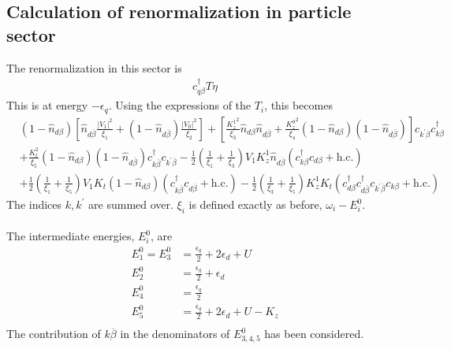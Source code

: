 \documentclass[twoside]{report}
\numberwithin{equation}{section}
\begin{document}
\subsection{Calculation of renormalization in particle sector}
The renormalization in this sector is
\begin{equation}\begin{aligned}
	c^\dagger_{q\beta} T \eta
\end{aligned}\end{equation}
This is at energy \(-\epsilon_q\).
Using the expressions of the \(T_i\), this becomes
\begin{equation}\begin{aligned}
	&\left(1 - \hat n_{d\beta}\right)\left[\hat n_{d\overline\beta}\frac{|V_1|^2}{\xi_1} + \left(1 - \hat n_{d\overline\beta}\right)\frac{|V_0|^2}{\xi_2}\right] + \left[\frac{{K_z^1}^2}{\xi_3}\hat n_{d\beta}\hat n_{d\overline\beta} + \frac{{K_z^0}^2}{\xi_4}\left(1 - \hat n_{d\beta}\right)\left(1 - \hat n_{d\overline\beta}\right)\right]c_{k^\prime\beta}c^\dagger_{k\beta} \\
	&+ \frac{K_t^2}{\xi_5}\left(1 - \hat n_{d\beta}\right)\left(1 - \hat n_{d\overline\beta}\right)c^\dagger_{k\overline\beta}c_{k^\prime\overline\beta} - \frac{1}{2}\left(\frac{1}{\xi_1} + \frac{1}{\xi_3} \right)V_1 K_z^1 \hat n_{d\overline\beta}\left(c^\dagger_{k\beta}c_{d\beta} + \text{h.c.}\right) \\
	&+ \frac{1}{2}\left(\frac{1}{\xi_1} + \frac{1}{\xi_5} \right)V_1 K_t \left(1 - \hat n_{d\beta}\right)\left(c^\dagger_{k\overline\beta}c_{d\overline\beta} + \text{h.c.}\right)- \frac{1}{2}\left(\frac{1}{\xi_3} + \frac{1}{\xi_5} \right)K_z^1 K_t \left(c^\dagger_{d\beta}c^\dagger_{d\overline\beta}c_{k^\prime\overline\beta}c_{k\beta} + \text{h.c.}\right)
\end{aligned}\end{equation}
The indices \(k,k^\prime\) are summed over.
\(\xi_i\) is defined exactly as before, \(\omega_i - E_i^0\).
\\\\The intermediate energies, \(E_i^0\), are
\begin{equation}\begin{aligned}
	E^0_1 = E_3^0 &= \frac{\epsilon_q}{2} + 2\epsilon_d + U\\
	E^0_2 &= \frac{\epsilon_q}{2} + \epsilon_d \\
	E^0_4 &= \frac{\epsilon_q}{2}\\
	E_5^0 &= \frac{\epsilon_q}{2} + 2\epsilon_d + U - K_z\\
\end{aligned}\end{equation}
The contribution of \(k\overline\beta\) in the denominators of \(E^0_{3,4,5}\) has been considered.
\end{document}
